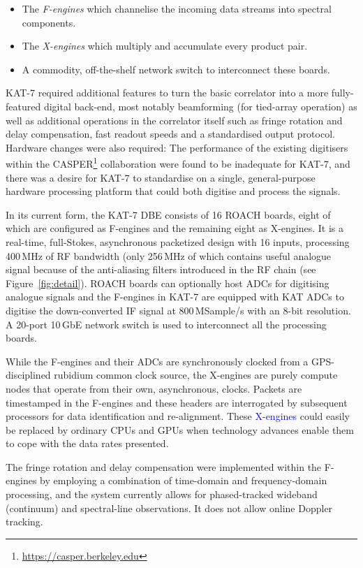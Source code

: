\begin{itemize}
\item The \textit{F-engines} which channelise the incoming data
  streams into spectral components.
\item The \textit{X-engines} which multiply and accumulate every
  product pair.
\item A commodity, off-the-shelf network switch to interconnect these
  boards.
\end{itemize}


KAT-7 required additional features to turn the basic correlator into a
more fully-featured digital back-end, most notably beamforming (for
tied-array operation) as well as additional operations in the
correlator itself such as fringe rotation and delay compensation, fast
readout speeds and a standardised output protocol. Hardware changes
were also required: The performance of the existing digitisers within
the CASPER\footnote{\url{https://casper.berkeley.edu}} collaboration
were found to be inadequate for KAT-7, and there was a desire for
KAT-7 to standardise on a single, general-purpose hardware processing
platform that could both digitise and process the signals.

In its current form, the KAT-7 DBE consists of 16 ROACH boards, eight of
which are configured as F-engines and the remaining eight as X-engines. It
is a real-time, full-Stokes, asynchronous packetized design with 16
inputs, processing 400\,MHz of RF bandwidth (only 256\,MHz of which
contains useful analogue signal because of the anti-aliasing filters
introduced in the RF chain (see Figure~\ref{fig:detail}).
ROACH boards can optionally host ADCs for digitising analogue signals
and the F-engines in KAT-7 are equipped with KAT ADCs to digitise the
down-converted IF signal at 800\,MSample/s with an 8-bit resolution. A
20-port 10\,GbE network switch is used to interconnect all the
processing boards.

While the F-engines and their ADCs are synchronously clocked from a
GPS-disciplined rubidium common clock source, the X-engines are purely
compute nodes that operate from their own, asynchronous,
clocks. Packets are timestamped in the F-engines and these headers are
interrogated by subsequent processors for data identification and
re-alignment. These \textcolor{blue}{X-engines} could easily be
replaced by ordinary CPUs and GPUs when technology advances enable
them to cope with the data rates presented.

The fringe rotation and delay compensation were implemented within the
F-engines by employing a combination of time-domain and
frequency-domain processing, and the system currently allows for
phased-tracked wideband (continuum) and spectral-line observations. It
does not allow online Doppler tracking.

